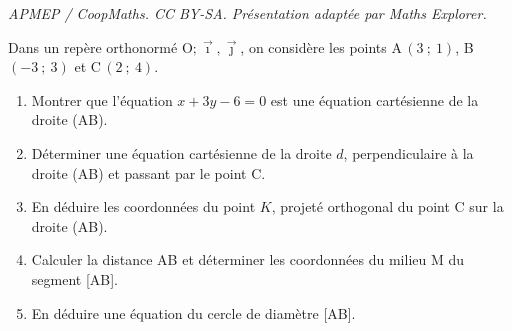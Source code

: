 \documentclass[10pt]{article}
\providecommand{\Oij}{\(\mathrm{O};\vec{\imath},\vec{\jmath}\)}
\begin{document}
\noindent\textit{APMEP / CoopMaths. CC BY-SA. Présentation adaptée par Maths Explorer.}\par\medskip
\bigskip

Dans un repère orthonormé \Oij{}, on considère les points A\,$(3~;~1)$, B\,$(-3~;~3)$ et C\,$(2~;~4)$.

\begin{enumerate}
\item Montrer que l'équation $x + 3y - 6 = 0$ est une équation cartésienne de la droite (AB).
\item Déterminer une équation cartésienne de la droite $d$, perpendiculaire à la droite (AB) et
passant par le point C.
\item En déduire les coordonnées du point $K$, projeté orthogonal du point C sur la droite (AB).
\item Calculer la distance AB et déterminer les coordonnées du milieu M du segment [AB].
\item En déduire une équation du cercle de diamètre [AB].
\end{enumerate}
\end{document}
